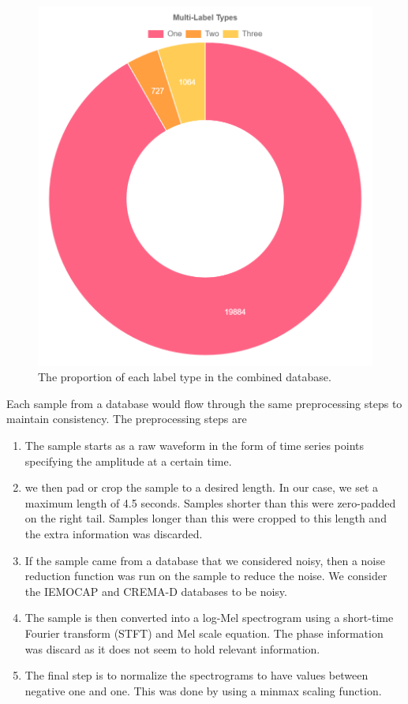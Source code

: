 \documentclass[conference]{IEEEtran}
\begin{document}
\begin{figure}[h!]
	\centering
	\hspace{6mm}
	\includegraphics[width=\linewidth]{combined_db_label_types.png} 
	\caption{The proportion of each label type in the combined database.}
	\label{fig:combined_db_db_split}
\end{figure}

Each sample from a database would flow through the same preprocessing steps to maintain consistency. The preprocessing steps are
\begin{enumerate}
	\item The sample starts as a raw waveform in the form of time series points specifying the amplitude at a certain time.
	\item we then pad or crop the sample to a desired length. In our case, we set a maximum length of 4.5 seconds. Samples shorter than this were zero-padded on the right tail. Samples longer than this were cropped to this length and the extra information was discarded.
	\item If the sample came from a database that we considered noisy, then a noise reduction function was run on the sample to reduce the noise. We consider the IEMOCAP and CREMA-D databases to be noisy.
	\item The sample is then converted into a log-Mel spectrogram using a short-time Fourier transform (STFT) and Mel scale equation. The phase information was discard as it does not seem to hold relevant information. \cite{}
	\item The final step is to normalize the spectrograms to have values between negative one and one. This was done by using a minmax scaling function.
\end{enumerate}
\end{document}
